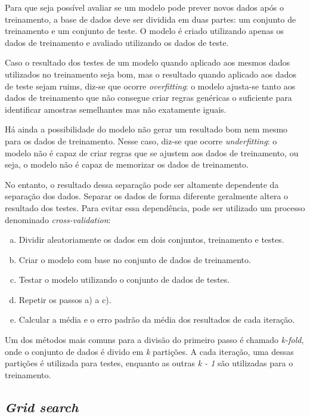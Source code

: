 Para que seja possível avaliar se um modelo pode prever novos dados após o treinamento, a base de dados deve ser dividida em duas partes: um conjunto de treinamento e um conjunto de teste. O modelo é criado utilizando apenas os dados de treinamento e avaliado utilizando os dados de teste.

Caso o resultado dos testes de um modelo quando aplicado aos mesmos dados utilizados no treinamento seja bom, mas o resultado quando aplicado aos dados de teste sejam ruims, diz-se que ocorre \emph{overfitting}: o modelo ajusta-se tanto aos dados de treinamento que não consegue criar regras genéricas o suficiente para identificar amostras semelhantes mas não exatamente iguais.

Há ainda a possibilidade do modelo não gerar um resultado bom nem mesmo para os dados de treinamento. Nesse caso, diz-se que ocorre \emph{underfitting}: o modelo não é capaz de criar regras que se ajustem aos dados de treinamento, ou seja, o modelo não é capaz de memorizar os dados de treinamento.

No entanto, o resultado dessa separação pode ser altamente dependente da separação dos dados. Separar os dados de forma diferente geralmente altera o resultado dos testes. Para evitar essa dependência, pode ser utilizado um processo denominado \emph{cross-validation}:

\begin{enumerate}[a)]
    \item Dividir aleatoriamente os dados em dois conjuntos, treinamento e testes.
    \item Criar o modelo com base no conjunto de dados de treinamento.
    \item Testar o modelo utilizando o conjunto de dados de testes.
    \item Repetir os passos a) a c).
    \item Calcular a média e o erro padrão da média dos resultados de cada iteração.
\end{enumerate}

Um dos métodos mais comuns para a divisão do primeiro passo é chamado \emph{\emph{k}-fold}, onde o conjunto de dados é divido em \emph{k} partições. A cada iteração, uma dessas partições é utilizada para testes, enquanto as outras \emph{k - 1} são utilizadas para o treinamento.

\subsection{\emph{Grid search}}

